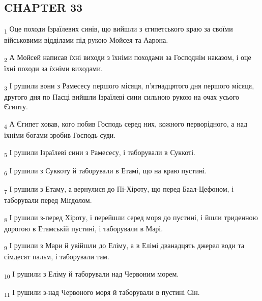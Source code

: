 \subsection{CHAPTER 33}
\begin{tcolorbox}
\textsubscript{1} Оце походи Ізраїлевих синів, що вийшли з єгипетського краю за своїми військовими відділами під рукою Мойсея та Аарона.
\end{tcolorbox}
\begin{tcolorbox}
\textsubscript{2} А Мойсей написав їхні виходи з їхніми походами за Господнім наказом, і оце їхні походи за їхніми виходами.
\end{tcolorbox}
\begin{tcolorbox}
\textsubscript{3} І рушили вони з Рамесесу першого місяця, п'ятнадцятого дня першого місяця, другого дня по Пасці вийшли Ізраїлеві сини сильною рукою на очах усього Єгипту.
\end{tcolorbox}
\begin{tcolorbox}
\textsubscript{4} А Єгипет ховав, кого побив Господь серед них, кожного перворідного, а над їхніми богами зробив Господь суди.
\end{tcolorbox}
\begin{tcolorbox}
\textsubscript{5} І рушили Ізраїлеві сини з Рамесесу, і таборували в Суккоті.
\end{tcolorbox}
\begin{tcolorbox}
\textsubscript{6} І рушили з Суккоту й таборували в Етамі, що на краю пустині.
\end{tcolorbox}
\begin{tcolorbox}
\textsubscript{7} І рушили з Етаму, а вернулися до Пі-Хіроту, що перед Баал-Цефоном, і таборували перед Міґдолом.
\end{tcolorbox}
\begin{tcolorbox}
\textsubscript{8} І рушили з-перед Хіроту, і перейшли серед моря до пустині, і йшли триденною дорогою в Етамській пустині, і таборували в Марі.
\end{tcolorbox}
\begin{tcolorbox}
\textsubscript{9} І рушили з Мари й увійшли до Еліму, а в Елімі дванадцять джерел води та сімдесят пальм, і таборували там.
\end{tcolorbox}
\begin{tcolorbox}
\textsubscript{10} І рушили з Еліму й таборували над Червоним морем.
\end{tcolorbox}
\begin{tcolorbox}
\textsubscript{11} І рушили з-над Червоного моря й таборували в пустині Сін.
\end{tcolorbox}

